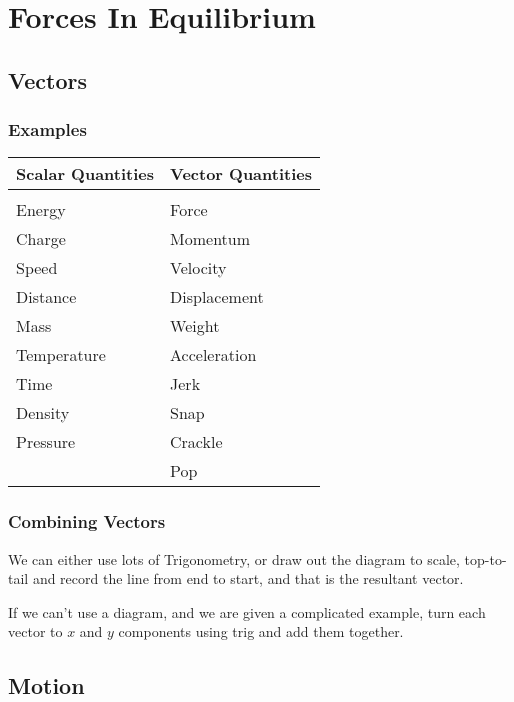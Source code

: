 \chapter{Forces In Equilibrium}

\section{Vectors}
\subsection{Examples}
\begin{tabular}{ll}
	\textbf{Scalar Quantities} & \textbf{Vector Quantities} \\
	\hline & \\
	Energy                     & Force                      \\
	Charge                     & Momentum                   \\
	Speed                      & Velocity                   \\
	Distance                   & Displacement               \\
	Mass                       & Weight                     \\
	Temperature                & Acceleration               \\
	Time                       & Jerk                       \\
	Density                    & Snap                       \\
	Pressure                   & Crackle                    \\
	& Pop                       
\end{tabular}

\subsection{Combining Vectors}
We can either use lots of Trigonometry, or draw out the diagram to scale, top-to-tail and record the line from end to start, and that is the resultant vector.

If we can't use a diagram, and we are given a complicated example, turn each vector to \(x\) and \(y\) components using trig and add them together.


\section{Motion}
